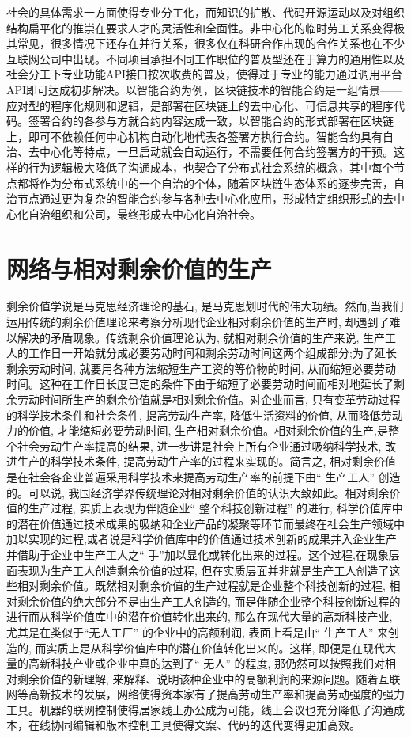 \documentclass{ctexart}
\begin{document}
社会的具体需求一方面使得专业分工化，而知识的扩散、代码开源运动以及对组织结构扁平化的推崇在要求人才的灵活性和全面性。非中心化的临时劳工关系变得极其常见，很多情况下还存在并行关系，很多仅在科研合作出现的合作关系也在不少互联网公司中出现。不同项目承担不同工作职位的普及型还在于算力的通用性以及社会分工下专业功能API接口按次收费的普及，使得过于专业的能力通过调用平台API即可达成初步解决。以智能合约为例，区块链技术的智能合约是一组情景——应对型的程序化规则和逻辑，是部署在区块链上的去中心化、可信息共享的程序代码。签署合约的各参与方就合约内容达成一致，以智能合约的形式部署在区块链上，即可不依赖任何中心机构自动化地代表各签署方执行合约。智能合约具有自治、去中心化等特点，一旦启动就会自动运行，不需要任何合约签署方的干预。这样的行为逻辑极大降低了沟通成本，也契合了分布式社会系统的概念，其中每个节点都将作为分布式系统中的一个自治的个体，随着区块链生态体系的逐步完善，自治节点通过更为复杂的智能合约参与各种去中心化应用，形成特定组织形式的去中心化自治组织和公司，最终形成去中心化自治社会。

\section{网络与相对剩余价值的生产}

剩余价值学说是马克思经济理论的基石, 是马克思划时代的伟大功绩。然而,当我们运用传统的剩余价值理论来考察分析现代企业相对剩余价值的生产时, 却遇到了难以解决的矛盾现象。传统剩余价值理论认为, 就相对剩余价值的生产来说, 生产工人的工作日一开始就分成必要劳动时间和剩余劳动时间这两个组成部分;为了延长剩余劳动时间, 就要用各种方法缩短生产工资的等价物的时间, 从而缩短必要劳动时间。这种在工作日长度已定的条件下由于缩短了必要劳动时间而相对地延长了剩余劳动时间所生产的剩余价值就是相对剩余价值。对企业而言, 只有变革劳动过程的科学技术条件和社会条件, 提高劳动生产率, 降低生活资料的价值, 从而降低劳动力的价值, 才能缩短必要劳动时间, 生产相对剩余价值。相对剩余价值的生产,是整个社会劳动生产率提高的结果, 进一步讲是社会上所有企业通过吸纳科学技术, 改进生产的科学技术条件, 提高劳动生产率的过程来实现的。简言之, 相对剩余价值是在社会各企业普遍采用科学技术来提高劳动生产率的前提下由“ 生产工人” 创造的。可以说, 我国经济学界传统理论对相对剩余价值的认识大致如此。相对剩余价值的生产过程, 实质上表现为伴随企业“ 整个科技创新过程” 的进行, 科学价值库中的潜在价值通过技术成果的吸纳和企业产品的凝聚等环节而最终在社会生产领域中加以实现的过程,或者说是科学价值库中的价值通过技术创新的成果并入企业生产并借助于企业中生产工人之“ 手”加以显化或转化出来的过程。这个过程,在现象层面表现为生产工人创造剩余价值的过程, 但在实质层面并非就是生产工人创造了这些相对剩余价值。既然相对剩余价值的生产过程就是企业整个科技创新的过程, 相对剩余价值的绝大部分不是由生产工人创造的, 而是伴随企业整个科技创新过程的进行而从科学价值库中的潜在价值转化出来的, 那么在现代大量的高新科技产业, 尤其是在类似于“无人工厂” 的企业中的高额利润, 表面上看是由“ 生产工人” 来创造的, 而实质上是从科学价值库中的潜在价值转化出来的\cite{刘冠军2006科技创新与相对剩余价值生产}。这样, 即便是在现代大量的高新科技产业或企业中真的达到了“ 无人” 的程度, 那仍然可以按照我们对相对剩余价值的新理解, 来解释、说明该种企业中的高额利润的来源问题。随着互联网等高新技术的发展，网络使得资本家有了提高劳动生产率和提高劳动强度的强力工具。机器的联网控制使得居家线上办公成为可能，线上会议也充分降低了沟通成本，在线协同编辑和版本控制工具使得文案、代码的迭代变得更加高效。
\end{document}
